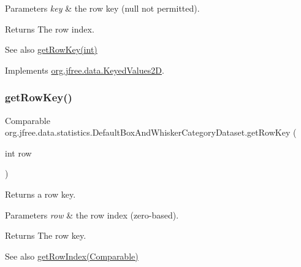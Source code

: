 \begin{DoxyParams}{Parameters}
{\em key} & the row key ({\ttfamily null} not permitted).\\
\hline
\end{DoxyParams}
\begin{DoxyReturn}{Returns}
The row index.
\end{DoxyReturn}
\begin{DoxySeeAlso}{See also}
\mbox{\hyperlink{classorg_1_1jfree_1_1data_1_1statistics_1_1_default_box_and_whisker_category_dataset_a7433281da93ea1c231c3d134c3c86aa9}{get\+Row\+Key(int)}} 
\end{DoxySeeAlso}


Implements \mbox{\hyperlink{interfaceorg_1_1jfree_1_1data_1_1_keyed_values2_d_ae92ded12999f2872687a5754ddf29254}{org.\+jfree.\+data.\+Keyed\+Values2D}}.

\mbox{\label{classorg_1_1jfree_1_1data_1_1statistics_1_1_default_box_and_whisker_category_dataset_a7433281da93ea1c231c3d134c3c86aa9}} 
\subsubsection{\texorpdfstring{get\+Row\+Key()}{getRowKey()}}
{\footnotesize\ttfamily Comparable org.\+jfree.\+data.\+statistics.\+Default\+Box\+And\+Whisker\+Category\+Dataset.\+get\+Row\+Key (\begin{DoxyParamCaption}\item[{int}]{row }\end{DoxyParamCaption})}

Returns a row key.


\begin{DoxyParams}{Parameters}
{\em row} & the row index (zero-\/based).\\
\hline
\end{DoxyParams}
\begin{DoxyReturn}{Returns}
The row key.
\end{DoxyReturn}
\begin{DoxySeeAlso}{See also}
\mbox{\hyperlink{classorg_1_1jfree_1_1data_1_1statistics_1_1_default_box_and_whisker_category_dataset_a0d0e397a4efbd71661d91aed88a2fceb}{get\+Row\+Index(\+Comparable)}} 
\end{DoxySeeAlso}


